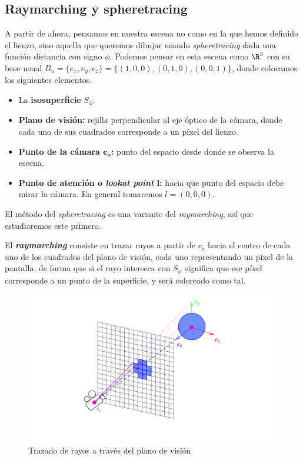 \subsection{Raymarching y spheretracing}\label{sec:tracing}
A partir de ahora, pensamos en nuestra escena no como en la que hemos definido el lienzo, sino aquella que queremos dibujar usando \textit{spheretracing} dada una función distancia con signo $\phi$. Podemos pensar en esta escena como $\R^3$ con su base usual $B_u = \{e_x,e_y,e_z\} = \{(1,0,0),(0,1,0),(0,0,1)\}$, donde colocamos los siguientes elementos.
\begin{itemize}
    \item La \textbf{isosuperficie} $S_{\phi}$.
    \item \textbf{Plano de visión:} rejilla perpendicular al eje óptico de la cámara, donde cada uno de sus cuadrados corresponde a un píxel del lienzo.
    \item \textbf{Punto de la cámara $\boldsymbol{c_o}$:} punto del espacio desde donde se observa la escena.
    \item \textbf{Punto de atención o \textit{lookat point} $\boldsymbol{l}$:} hacia que punto del espacio debe mirar la cámara. En general tomaremos $l=(0,0,0)$.
\end{itemize}
El método del \textit{spheretracing} es una variante del \textit{raymarching}, así que estudiaremos este primero.\newline

El \textbf{\textit{raymarching}} consiste en trazar rayos a partir de $c_o$ hacia el centro de cada uno de los cuadrados del plano de visión, cada uno representando un píxel de la pantalla, de forma que si el rayo interseca con $S_\phi$ significa que ese píxel corresponde a un punto de la superficie, y será coloreado como tal.
\begin{figure}[h]
    \centering
    \includegraphics[width=\textwidth]{Plantilla-TFG-master/img/raymarch_fix.png}
    \caption{Trazado de rayos a través del plano de visión}
    \label{fig:raymarch1}
\end{figure}
\newline

